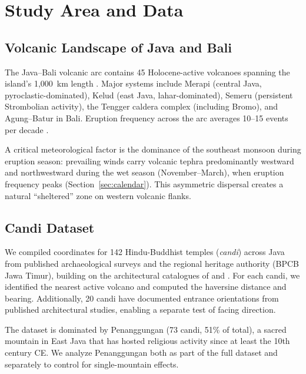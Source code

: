 \documentclass[12pt,a4paper]{article}
\begin{document}
\section{Study Area and Data}

\subsection{Volcanic Landscape of Java and Bali}

The Java--Bali volcanic arc contains 45 Holocene-active volcanoes spanning the island's 1,000~km length \citep{whitten1996, thouret1999}. Major systems include Merapi (central Java, pyroclastic-dominated), Kelud (east Java, lahar-dominated), Semeru (persistent Strombolian activity), the Tengger caldera complex (including Bromo), and Agung--Batur in Bali. Eruption frequency across the arc averages 10--15 events per decade \citep{gvp2023}.

A critical meteorological factor is the dominance of the southeast monsoon during eruption season: prevailing winds carry volcanic tephra predominantly westward and northwestward during the wet season (November--March), when eruption frequency peaks (Section~\ref{sec:calendar}). This asymmetric dispersal creates a natural ``sheltered'' zone on western volcanic flanks.

\subsection{Candi Dataset}

We compiled coordinates for 142 Hindu-Buddhist temples (\emph{candi}) across Java from published archaeological surveys and the regional heritage authority (BPCB Jawa Timur), building on the architectural catalogues of \citet{dumarcay1993} and \citet{soekmono1995}. For each candi, we identified the nearest active volcano and computed the haversine distance and bearing. Additionally, 20 candi have documented entrance orientations from published architectural studies, enabling a separate test of facing direction.

The dataset is dominated by Penanggungan (73 candi, 51\% of total), a sacred mountain in East Java that has hosted religious activity since at least the 10th century CE. We analyze Penanggungan both as part of the full dataset and separately to control for single-mountain effects.
\end{document}
